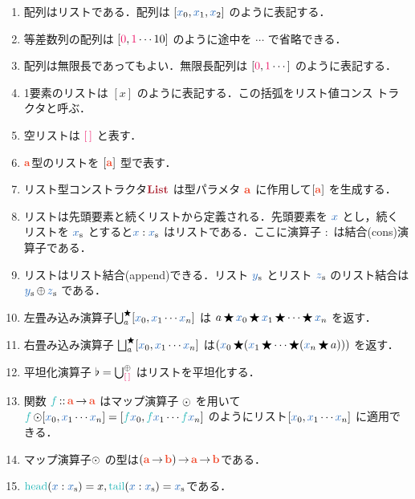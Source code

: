 \documentclass[a5paper,twoside,fleqn,draft]{jsbook}
\begin{document}
\begin{enumerate}
\item 配列はリストである．配列は $[\hVar{x}_0,\hVar{x}_1,\hVar{x}_2]$ のように表記する．
\item 等差数列の配列は $[\hConstant{0},\hConstant{1}\dotsb10]$ のように途中を $\dotsb$ で省略できる．
\item 配列は無限長であってもよい．無限長配列は $[\hConstant{0},\hConstant{1}\dotsb]$ のように表記する．
\item 1要素のリストは $[x]$ のように表記する．この括弧をリスト値コンス
  トラクタと呼ぶ．
\item 空リストは $\mEmptyList$ と表す．
\item $\mA $型のリストを $[\mA]$ 型で表す．
\item リスト型コンストラクタ$\mListTypeConstructor$ は型パラメタ $\mA$ に作用して$[\mA]$ を生成する．
\item リストは先頭要素と続くリストから定義される．先頭要素を $\hVar{x}$ とし，続くリストを $\mList{x}$ とすると$\hVar{x}:\mList{x}$ はリストである．ここに演算子 $:$ は結合(cons)演算子である．
\item リストはリスト結合(append)できる．リスト $\mList{y}$ とリスト $\mList{z}$ のリスト結合は $\mList{y}\mAppend\mList{z}$ である．
\item 左畳み込み演算子$\mFold^{\hAnyBinOp}_a[\hVar{x}_0,\hVar{x}_1\dotsb \hVar{x}_n]$ は $a\hAnyBinOp \hVar{x}_0\hAnyBinOp \hVar{x}_1\hAnyBinOp\dotsb\hAnyBinOp \hVar{x}_n$ を返す．
\item 右畳み込み演算子 $\mFoldRight^{\hAnyBinOp}_{a}[\hVar{x}_0,\hVar{x}_1\dotsb \hVar{x}_n]$ は$(\hVar{x}_0\hAnyBinOp(\hVar{x}_1\hAnyBinOp\dotsb\hAnyBinOp(\hVar{x}_n\hAnyBinOp a)))$ を返す．
\item 平坦化演算子 $\mJoinList=\mFold_\mEmptyList^{\mAppend}$ はリストを平坦化する．
\item 関数 $\hFunc{f}\mIn\mProjEXP{\mA }{\mA }$ はマップ演算子 $\operatorname{\odot}$ を用いて $\hFunc{f}\mMapList[\hVar{x}_0,\hVar{x}_1\dotsb \hVar{x}_n]=[\hFunc{f}\hVar{x}_0,\hFunc{f}\hVar{x}_1\dotsb \hFunc{f}\hVar{x}_n]$ のようにリスト$[\hVar{x}_0,\hVar{x}_1\dotsb \hVar{x}_n]$ に適用できる．
\item マップ演算子$\operatorname{\odot}$ の型は$\mProjEXP{(\mProjEXP{\mA }{\mB})}{\mProjEXP{\mA }{\mB }}$である．
\item $\mHead(\hVar{x}:\mList{x})=x,\mTail(\hVar{x}:\mList{x})=\mList{x}$である．
\end{enumerate}

\end{document}
